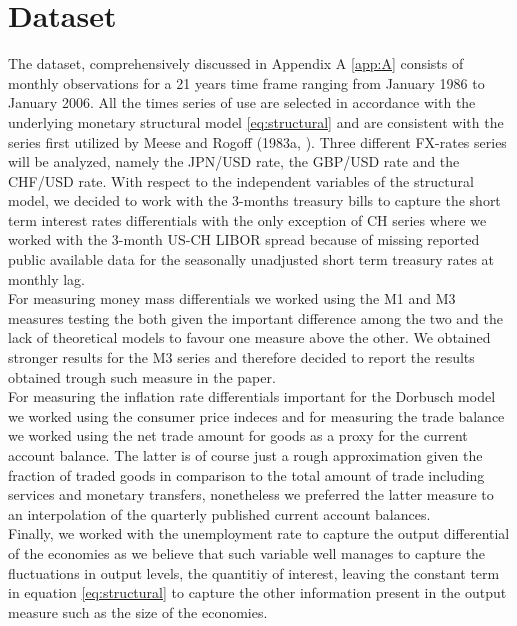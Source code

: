 \section{Dataset} \label{sec:dataset}

The dataset, comprehensively discussed in Appendix A \ref{app:A} consists of
monthly observations for a 21 years time frame ranging
from January 1986 to January 2006.
All the times series of use are selected in accordance with the underlying monetary
structural model \ref{eq:structural} and are consistent with the series first utilized by
Meese and Rogoff (1983a, \cite{MeeseRogoffa}). Three different FX-rates series will be
analyzed, namely the JPN/USD rate, the GBP/USD rate and the CHF/USD rate.
With respect to the independent variables of the structural model, we decided to work
with the 3-months treasury bills to capture the short term interest rates differentials
with the only exception of CH series where we worked with the 3-month US-CH LIBOR spread
because of missing reported public available data for the seasonally unadjusted short term treasury rates at monthly lag.
\\ For measuring money mass differentials
we worked using the M1 and M3 measures testing the both given the important difference among the two 
and the lack of theoretical models to favour one measure above the other. We obtained stronger results for the M3 series
and therefore decided to report the results obtained trough such measure in the paper. \\ For measuring the
inflation rate differentials important for the Dorbusch model we worked using the consumer price indeces and
for measuring the trade balance we worked using the net trade amount for goods as a proxy for the current account balance.
The latter is of course just a rough approximation
given the fraction of traded goods in comparison to the total amount of trade including services and monetary transfers,
nonetheless we preferred the latter measure to an interpolation of the quarterly published current account balances. \\
Finally, we worked with the unemployment rate to capture the output differential of the economies as we
believe that such variable
well manages to capture the fluctuations in output levels, the quantitiy of interest, leaving
the constant term in equation \ref{eq:structural} to capture the other information present
in the output measure such as the size of the economies.

